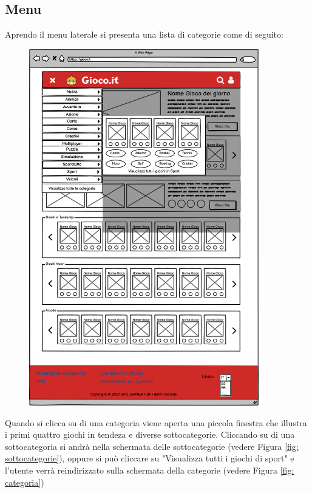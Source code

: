\documentclass[../Report.tex]{subfiles}
\begin{document}
    \subsection{Menu}
    Aprendo il menu laterale si presenta una lista di categorie come di seguito:
    \begin{figure}[H]
        \includegraphics[width=10cm]{WMenu.png}
        \centering
    \end{figure}
    Quando si clicca su di una categoria viene aperta una piccola finestra che illustra i primi quattro giochi in tendeza e diverse sottocategorie. Cliccando su di una sottocategoria si andrà nella schermata delle sottocategorie (vedere Figura \ref{fig: sottocategorie}), oppure si può cliccare su "Visualizza tutti i giochi di sport" e l'utente verrà reindirizzato sulla schermata della categorie (vedere Figura \ref{fig: categoria})
    
\end{document}
